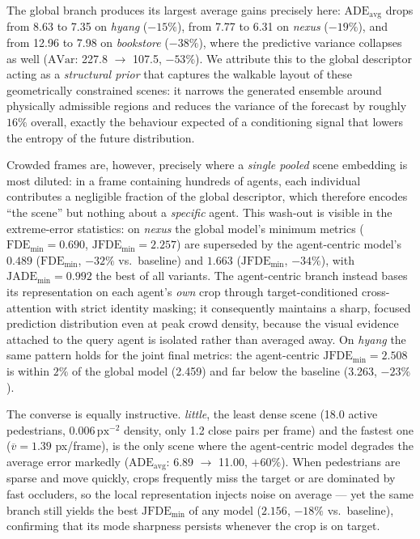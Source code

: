 \documentclass[11pt,a4paper]{article}
\begin{document}
The global branch produces its largest average gains precisely here:
$\mathrm{ADE_{avg}}$ drops from 8.63 to 7.35 on \emph{hyang} ($-15\%$), from
7.77 to 6.31 on \emph{nexus} ($-19\%$), and from 12.96 to 7.98 on
\emph{bookstore} ($-38\%$), where the predictive variance collapses as well
($\mathrm{AVar}$: 227.8 $\to$ 107.5, $-53\%$). We attribute this to the global
descriptor acting as a \emph{structural prior} that captures the walkable
layout of these geometrically constrained scenes: it narrows the generated
ensemble around physically admissible regions and reduces the variance of the
forecast by roughly $16\%$ overall, exactly the behaviour expected of a
conditioning signal that lowers the entropy of the future distribution.

Crowded frames are, however, precisely where a {\em single pooled} scene
embedding is most diluted: in a frame containing hundreds of agents, each
individual contributes a negligible fraction of the global descriptor, which
therefore encodes ``the scene'' but nothing about a \emph{specific} agent.
This wash-out is visible in the extreme-error statistics: on \emph{nexus} the
global model's minimum metrics ($\mathrm{FDE_{min}} = 0.690$,
$\mathrm{JFDE_{min}} = 2.257$) are superseded by the agent-centric model's
$0.489$ ($\mathrm{FDE_{min}}$, $-32\%$ vs.\ baseline) and $1.663$
($\mathrm{JFDE_{min}}$, $-34\%$), with $\mathrm{JADE_{min}} = 0.992$ the best
of all variants. The agent-centric branch instead bases its
representation on each agent's \emph{own} crop through target-conditioned
cross-attention with strict identity masking; it consequently maintains a sharp,
focused prediction distribution even at peak crowd density, because the visual
evidence attached to the query agent is isolated rather than averaged away.
On \emph{hyang} the same pattern holds for the joint final metrics: the
agent-centric $\mathrm{JFDE_{min}} = 2.508$ is within $2\%$ of the global model
(2.459) and far below the baseline (3.263, $-23\%$).

The converse is equally instructive. \emph{little}, the least dense scene
(18.0 active pedestrians, $0.006\,\mathrm{px}^{-2}$ density, only 1.2 close
pairs per frame) and the fastest one ($\overline v = 1.39$ px/frame), is the
only scene where the agent-centric model degrades the average error markedly
($\mathrm{ADE_{avg}}$: 6.89 $\to$ 11.00, $+60\%$). When pedestrians are sparse
and move quickly, crops frequently miss the target or are dominated by fast
occluders, so the local representation injects noise on average --- yet the
same branch still yields the best $\mathrm{JFDE_{min}}$ of any model
($2.156$, $-18\%$ vs.\ baseline), confirming that its mode sharpness persists
whenever the crop is on target.
\end{document}
